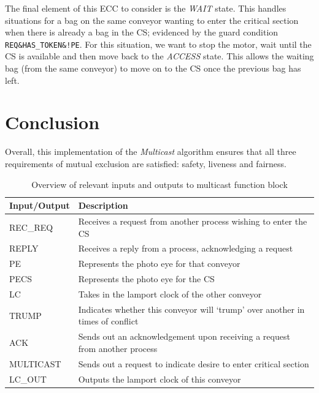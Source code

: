 \documentclass[12pt, conference]{IEEEtran}
\begin{document}
The final element of this ECC to consider is the \textit{WAIT} state. This
handles situations for a bag on the same conveyor wanting to enter the critical
section when there is already a bag in the CS; evidenced by the
guard condition \texttt{REQ\&HAS\_TOKEN\&!PE}. For this situation, we want to
stop the motor, wait until the CS is available and then move back
to the \textit{ACCESS} state. This allows the waiting bag (from the same
conveyor) to move on to the CS once the previous bag has left.

\section{Conclusion}
Overall, this implementation of the \textit{Multicast} algorithm ensures that all three requirements of mutual
exclusion are satisfied: safety, liveness and fairness. 

\begin{table}[t]
\caption{Overview of relevant inputs and outputs to multicast function block}
\begin{center}
  \begin{tabular}{|l|l|}
\hline
    Input/Output & Description \\
\hline
    REC\_REQ & Receives a request from another process wishing to enter the
    CS\\
\hline
    REPLY & Receives a reply from a process, acknowledging a request \\
\hline
    PE & Represents the photo eye for that conveyor \\
\hline
    PECS & Represents the photo eye for the CS\\
\hline
    LC & Takes in the lamport clock of the other conveyor \\
\hline
    TRUMP & Indicates whether this conveyor will `trump' over another in times
    of conflict\\
\hline
    ACK & Sends out an acknowledgement upon receiving a request from another
    process \\
\hline
    MULTICAST & Sends out a request to indicate desire to enter critical
    section \\
\hline
    LC\_OUT & Outputs the lamport clock of this conveyor \\
\hline
\end{tabular}
\label{tab:multicast-io}
\end{center}
\end{table}
\end{document}
